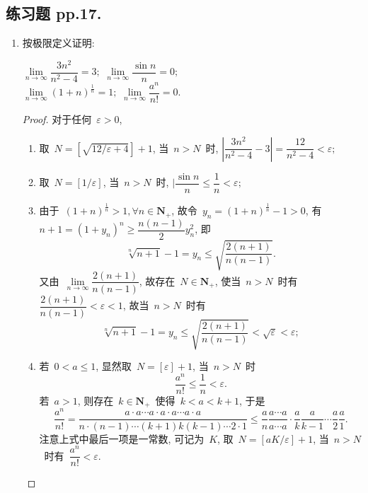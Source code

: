 \documentclass[UTF8,a4paper,11pt,twoside]{book}
\begin{document}
\subsection{练习题 pp.17.}
\begin{enumerate}
	\item 按极限定义证明:
	      \begin{tabenum}[(1)]
		      \tabenumitem $\lim\limits_{n\to\infty} \dfrac{3n^2}{n^2-4}=3;$
		      \tabenumitem $\lim\limits_{n\to\infty} \dfrac{\sin{n}}{n}=0;$\\
		      \tabenumitem $\lim\limits_{n\to\infty} (1+n)^{\frac{1}{n}}=1;$
		      \tabenumitem $\lim\limits_{n\to\infty} \dfrac{a^n}{n!}=0.$
	      \end{tabenum}
	      \begin{proof}
		      对于任何~$\varepsilon>0$,
		      \begin{enumerate}[(1)]
			      \item 取~$N=[\sqrt{12/\varepsilon+4}]+1$, 当~$n>N$~时, $|\dfrac{3n^2}{n^2-4}-3|=\dfrac{12}{n^2-4}<\varepsilon;$
			      \item 取~$N=[1/\varepsilon]$, 当~$n>N$~时, $|\dfrac{\sin{n}}{n}\leqslant\dfrac{1}{n}<\varepsilon;$
			      \item 由于~$(1+n)^{\frac{1}{n}}>1, \forall n\in\mathbf{N}_{+}$, 故令~$y_n=(1+n)^{\frac{1}{n}}-1>0$, 有$n+1=(1+y_n)^n\geqslant \dfrac{n(n-1)}{2}y_n^2$, 即
			            \[
				            \sqrt[n]{n+1}-1=y_n\leqslant\sqrt{\dfrac{2(n+1)}{n(n-1)}}.
			            \]
			            又由~$\lim\limits_{n\to\infty}\dfrac{2(n+1)}{n(n-1)}$, 故存在~$N\in\mathbf{N}_{+}$, 使当~$n>N$~时有~$\dfrac{2(n+1)}{n(n-1)}<\varepsilon<1$, 故当~$n>N$~时有
			            \[
				            \sqrt[n]{n+1}-1=y_n\leqslant\sqrt{\dfrac{2(n+1)}{n(n-1)}}<\sqrt{\varepsilon}<\varepsilon;
			            \]
			      \item 若~$0<a\leqslant 1$, 显然取~$N=[\varepsilon]+1$, 当~$n>N$~时
			            \[
				            \dfrac{a^n}{n!}\leqslant\dfrac{1}{n}<\varepsilon.
			            \]
			            若~$a>1$, 则存在~$k\in\mathbf{N}_{+}$~使得~$k<a<k+1$, 于是
			            \[
				            \dfrac{a^n}{n!}=\dfrac{a\cdot a\cdots a\cdot a\cdot a\cdots a\cdot a}{n\cdot(n-1)\cdots(k+1)k(k-1)\cdots2\cdot1}\leqslant\dfrac{a}{n}\dfrac{a\cdots a}{a\cdots a}\cdot\dfrac{a}{k}\dfrac{a}{k-1}\cdots\dfrac{a}{2}\dfrac{a}{1}.
			            \]
			            注意上式中最后一项是一常数, 可记为~$K$, 取~$N=[aK/\varepsilon]+1$, 当~$n>N$~时有~$\dfrac{a^n}{n!}<\varepsilon.$\qedhere
		      \end{enumerate}

\end{proof}
\end{enumerate}
\end{document}
